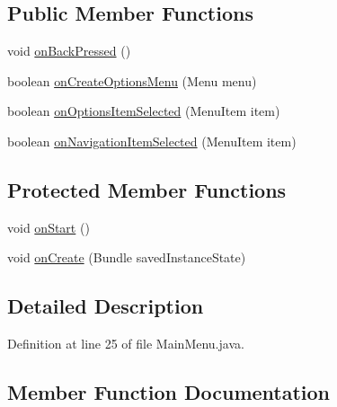 \subsection*{Public Member Functions}
\begin{DoxyCompactItemize}
\item 
void \hyperlink{classcom_1_1example_1_1memorism_1_1_main_menu_a95779c69310377bd8a179729860b8378}{on\+Back\+Pressed} ()
\item 
boolean \hyperlink{classcom_1_1example_1_1memorism_1_1_main_menu_acb3ffdf12dfd08e510ce6aa55c65b52c}{on\+Create\+Options\+Menu} (Menu menu)
\item 
boolean \hyperlink{classcom_1_1example_1_1memorism_1_1_main_menu_a6af03ac2a8ca72dc6b763caab4707bad}{on\+Options\+Item\+Selected} (Menu\+Item item)
\item 
boolean \hyperlink{classcom_1_1example_1_1memorism_1_1_main_menu_a49832e3cb7178b6f317a38cd88f05bf2}{on\+Navigation\+Item\+Selected} (Menu\+Item item)
\end{DoxyCompactItemize}
\subsection*{Protected Member Functions}
\begin{DoxyCompactItemize}
\item 
void \hyperlink{classcom_1_1example_1_1memorism_1_1_main_menu_ab8ad80a15fae9ec3ade6b9ce0a108435}{on\+Start} ()
\item 
void \hyperlink{classcom_1_1example_1_1memorism_1_1_main_menu_a1739715a74237054762ff983fadeed4d}{on\+Create} (Bundle saved\+Instance\+State)
\end{DoxyCompactItemize}


\subsection{Detailed Description}


Definition at line 25 of file Main\+Menu.\+java.



\subsection{Member Function Documentation}
